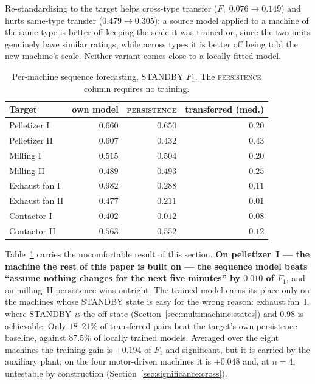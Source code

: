 Re-standardising to the target helps cross-type transfer ($F_1$
$0.076\rightarrow0.149$) and hurts same-type transfer
($0.479\rightarrow0.305$): a source model applied to a machine of the
same type is better off keeping the scale it was trained on, since the
two units genuinely have similar ratings, while across types it is
better off being told the new machine's scale. Neither variant comes
close to a locally fitted model.

\begin{table}[t]
\centering
\caption{Per-machine sequence forecasting, STANDBY $F_1$. The
\textsc{persistence} column requires no training.}
\label{tab:transfer:persistence}
\small
\begin{tabular}{@{}lrrr@{}}
\toprule
Target & own model & \textsc{persistence} & transferred (med.) \\
\midrule
Pelletizer I   & $0.660$ & $0.650$ & $0.20$ \\
Pelletizer II  & $0.607$ & $0.432$ & $0.43$ \\
Milling I      & $0.515$ & $0.504$ & $0.20$ \\
Milling II     & $0.489$ & $\mathbf{0.493}$ & $0.25$ \\
Exhaust fan I  & $\mathbf{0.982}$ & $0.288$ & $0.11$ \\
Exhaust fan II & $0.477$ & $0.211$ & $0.01$ \\
Contactor I    & $0.402$ & $0.012$ & $0.08$ \\
Contactor II   & $0.563$ & $0.552$ & $0.12$ \\
\bottomrule
\end{tabular}
\end{table}

Table~\ref{tab:transfer:persistence} carries the uncomfortable result of
this section. \textbf{On pelletizer~I --- the machine the rest of this
paper is built on --- the sequence model beats ``assume nothing changes
for the next five minutes'' by $0.010$ of $F_1$}, and on milling~II
persistence wins outright. The trained model earns its place only on the
machines whose STANDBY state is easy for the wrong reason: exhaust
fan~I, where STANDBY \emph{is} the off state
(Section~\ref{sec:multimachine:states}) and $0.98$ is achievable. Only
$18$--$21\%$ of transferred pairs beat the target's own persistence
baseline, against $87.5\%$ of locally trained models. Averaged over the
eight machines the training gain is $+0.194$ of $F_1$ and significant,
but it is carried by the auxiliary plant; on the four motor-driven
machines it is $+0.048$ and, at $n=4$, untestable by construction
(Section~\ref{sec:significance:cross}).

